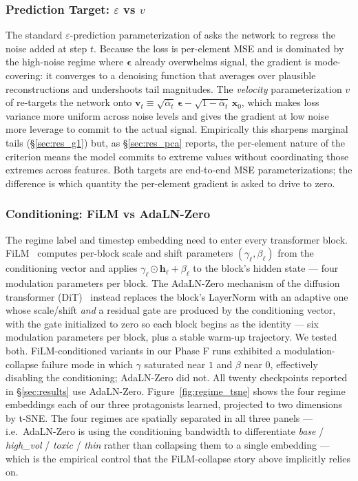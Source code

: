 \documentclass[journal]{IEEEtran}
\newcommand{\eps}{\varepsilon}
\theoremstyle{definition}   %
\begin{document}
\subsubsection{Prediction Target: $\eps$ vs $v$}
\label{sec:pred_target}

The standard $\eps$-prediction parameterization of \cite{ho2020denoising}
asks the network to regress the noise added at step $t$. Because the
loss is per-element MSE and is dominated by the high-noise regime where
$\boldsymbol\epsilon$ already overwhelms signal, the gradient is
mode-covering: it converges to a denoising function that averages over
plausible reconstructions and undershoots tail magnitudes. The
\emph{velocity} parameterization $v$ of \cite{salimans2022progressive}
re-targets the network onto
$\mathbf{v}_t \equiv \sqrt{\bar\alpha_t}\,\boldsymbol\epsilon - \sqrt{1-\bar\alpha_t}\,\mathbf{x}_0$,
which makes loss variance more uniform across noise levels and gives the
gradient at low noise more leverage to commit to the actual signal.
Empirically this sharpens marginal tails (\S\ref{sec:res_g1}) but, as
\S\ref{sec:res_pca} reports, the per-element nature of the criterion
means the model commits to extreme values without coordinating those
extremes across features. Both targets are end-to-end MSE
parameterizations; the difference is which quantity the per-element
gradient is asked to drive to zero.

\subsubsection{Conditioning: FiLM vs AdaLN-Zero}
\label{sec:conditioning}

The regime label and timestep embedding need to enter every transformer
block. FiLM~\cite{perez2018film} computes per-block scale and shift
parameters $(\gamma_\ell, \beta_\ell)$ from the conditioning vector and
applies $\gamma_\ell\odot\mathbf{h}_\ell + \beta_\ell$ to the block's
hidden state --- four modulation parameters per block. The AdaLN-Zero
mechanism of the diffusion transformer (DiT)~\cite{peebles2023scalable}
instead replaces the block's LayerNorm with an adaptive one whose
scale/shift \emph{and} a residual gate are produced by the conditioning
vector, with the gate initialized to zero so each block begins as the
identity --- six modulation parameters per block, plus a stable warm-up
trajectory. We tested both. FiLM-conditioned variants in our Phase F
runs exhibited a modulation-collapse failure mode in which $\gamma$
saturated near $1$ and $\beta$ near $0$, effectively disabling the
conditioning; AdaLN-Zero did not. All twenty checkpoints reported in
\S\ref{sec:results} use AdaLN-Zero.
Figure~\ref{fig:regime_tsne} shows the four regime embeddings each
of our three protagonists learned, projected to two dimensions by
t-SNE. The four regimes are spatially separated in all three panels
--- i.e.\ AdaLN-Zero is using the conditioning bandwidth to
differentiate \emph{base} / \emph{high\_vol} / \emph{toxic} /
\emph{thin} rather than collapsing them to a single embedding ---
which is the empirical control that the FiLM-collapse story above
implicitly relies on.
\end{document}

